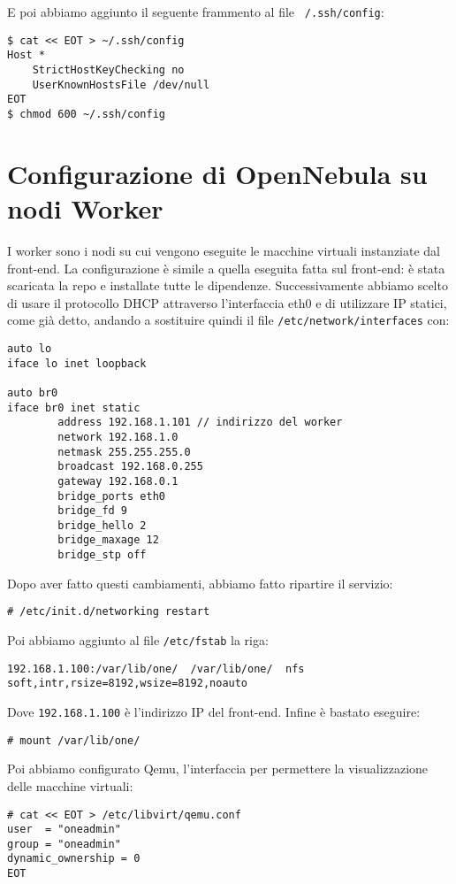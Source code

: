 \documentclass[twoside]{article}
\begin{document}
E poi abbiamo aggiunto il seguente frammento al file \texttt{~/.ssh/config}:
\begin{lstlisting}[frame=trBL]
$ cat << EOT > ~/.ssh/config
Host *
    StrictHostKeyChecking no
    UserKnownHostsFile /dev/null
EOT
$ chmod 600 ~/.ssh/config
\end{lstlisting}

\section{Configurazione di OpenNebula su nodi Worker}
I worker sono i nodi su cui vengono eseguite le macchine virtuali instanziate dal front-end.
La configurazione è simile a quella eseguita fatta sul front-end: è stata scaricata la repo
e installate tutte le dipendenze. Successivamente abbiamo scelto di usare il protocollo DHCP
attraverso l'interfaccia eth0 e di utilizzare IP statici, come già detto, andando a sostituire
quindi il file \texttt{/etc/network/interfaces} con:
\begin{lstlisting}[frame=trBL]
auto lo
iface lo inet loopback

auto br0
iface br0 inet static
        address 192.168.1.101 // indirizzo del worker
        network 192.168.1.0
        netmask 255.255.255.0
        broadcast 192.168.0.255
        gateway 192.168.0.1
        bridge_ports eth0
        bridge_fd 9
        bridge_hello 2
        bridge_maxage 12
        bridge_stp off
\end{lstlisting}

Dopo aver fatto questi cambiamenti, abbiamo fatto ripartire il servizio:
\begin{lstlisting}[frame=trBL]
# /etc/init.d/networking restart
\end{lstlisting}

Poi abbiamo aggiunto al file \texttt{/etc/fstab} la riga:
\begin{lstlisting}[frame=trBL]
192.168.1.100:/var/lib/one/  /var/lib/one/  nfs   soft,intr,rsize=8192,wsize=8192,noauto
\end{lstlisting}

Dove \texttt{192.168.1.100} è l'indirizzo IP del front-end. Infine è bastato eseguire:
\begin{lstlisting}[frame=trBL]
# mount /var/lib/one/
\end{lstlisting}

Poi abbiamo configurato Qemu, l'interfaccia per permettere la visualizzazione delle macchine virtuali:
\begin{lstlisting}[frame=trBL]
# cat << EOT > /etc/libvirt/qemu.conf
user  = "oneadmin"
group = "oneadmin"
dynamic_ownership = 0
EOT
\end{lstlisting}
\end{document}
